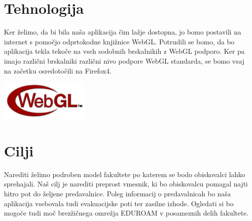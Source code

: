 \documentclass[10pt,a4paper]{article}
\begin{document}
\section{Tehnologija}
Ker želimo, da bi bila naša aplikacija čim lažje dostopna, jo bomo postavili na internet s pomočjo odprtokodne knjižnice WebGL. Potrudili se bomo, da bo aplikacija tekla tekoče na vseh sodobnih brskalnikih z WebGL podporo. Ker pa imajo različni brskalniki različni nivo podpore WebGL standarda, se bomo vsaj na začetku osredotočili na Firefox4. \\
\begin{center}
\includegraphics{./WebGL.png}
\end{center}
\section{Cilji}
Narediti želimo podroben model fakultete po katerem se bodo obiskovalci lahko sprehajali. Naš cilj je narediti preprost vmesnik, ki bo obiskovalcu pomagal najti hitro pot do željene predavalnice. Poleg informacij o predavalnicah bo naša aplikacija vsebovala tudi evakuacijske poti ter zasilne izhode. Ogledati si bo mogoče tudi moč brezžičnega omrežja EDUROAM v posameznih delih fakultete.
\end{document}
